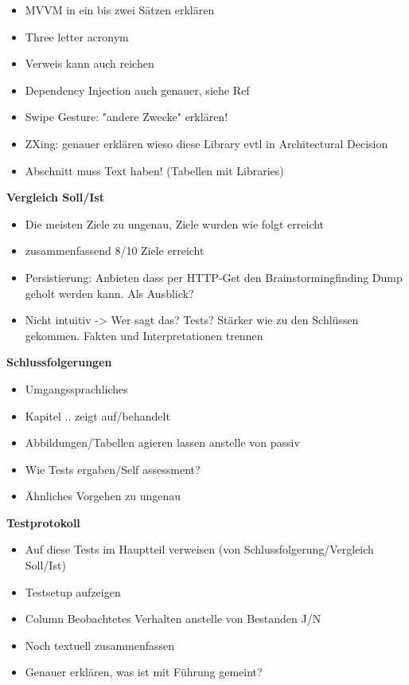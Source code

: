 \begin{itemize}

\item
  MVVM in ein bis zwei Sätzen erklären
\item
  Three letter acronym
\item
  Verweis kann auch reichen
\item
  Dependency Injection auch genauer, siehe Ref
\item
  Swipe Gesture: "andere Zwecke" erklären!
\item
  ZXing: genauer erklären wieso diese Library evtl in Architectural
  Decision
\item
  Abschnitt muss Text haben! (Tabellen mit Libraries)
\end{itemize}

\textbf{Vergleich Soll/Ist}

\begin{itemize}

\item
  Die meisten Ziele zu ungenau, Ziele wurden wie folgt erreicht
\item
  zusammenfassend 8/10 Ziele erreicht
\item
  Persistierung: Anbieten dass per HTTP-Get den Brainstormingfinding
  Dump geholt werden kann. Als Ausblick?
\item
  Nicht intuitiv -\textgreater{} Wer sagt das? Tests? Stärker wie zu den
  Schlüssen gekommen. Fakten und Interpretationen trennen
\end{itemize}

\textbf{Schlussfolgerungen}

\begin{itemize}

\item
  Umgangssprachliches
\item
  Kapitel .. zeigt auf/behandelt
\item
  Abbildungen/Tabellen agieren lassen anstelle von passiv
\item
  Wie Tests ergaben/Self assessment?
\item
  Ähnliches Vorgehen zu ungenau
\end{itemize}

\textbf{Testprotokoll}

\begin{itemize}

\item
  Auf diese Tests im Hauptteil verweisen (von Schlussfolgerung/Vergleich
  Soll/Ist)
\item
  Testsetup aufzeigen
\item
  Column Beobachtetes Verhalten anstelle von Bestanden J/N
\item
  Noch textuell zusammenfassen
\item
  Genauer erklären, was ist mit Führung gemeint?
\end{itemize}


